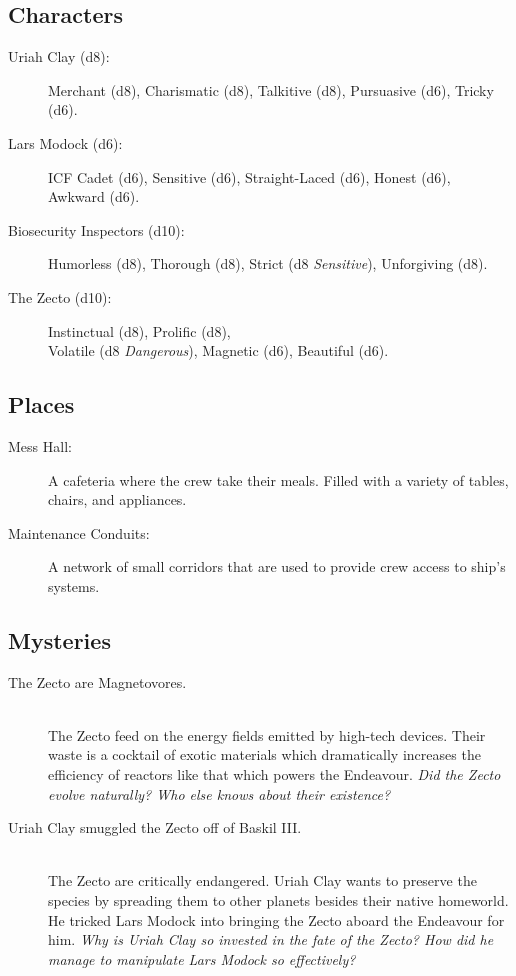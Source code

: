 \documentclass[11pt, a5paper, parskip=half-, DIV=12]{scrartcl}
\begin{document}
\newpage

\subsection*{Characters}
\begin{description}
	\item[Uriah Clay (d8):] Merchant (d8), Charismatic (d8), Talkitive (d8), Pursuasive (d6), Tricky (d6).
	\item[Lars Modock (d6):] ICF Cadet (d6), Sensitive (d6), Straight-Laced (d6), Honest (d6), Awkward (d6).
	\item[Biosecurity Inspectors (d10):] Humorless (d8), Thorough (d8), Strict (d8 \textit{Sensitive}), Unforgiving (d8).  
	\item[The Zecto (d10):] Instinctual (d8), Prolific (d8), \\Volatile (d8 \textit{Dangerous}), Magnetic (d6), Beautiful (d6).
\end{description}

\subsection*{Places}
\begin{description}
	\item[Mess Hall:] A cafeteria where the crew take their meals. Filled with a variety of tables, chairs, and appliances.
	\item[Maintenance Conduits:] A network of small corridors that are used to provide crew access to ship's systems.
\end{description}

\subsection*{Mysteries}
\begin{description}
	\item[The Zecto are Magnetovores.] \phantom{a} \\ The Zecto feed on the energy fields emitted by high-tech devices. Their waste is a cocktail of exotic materials which dramatically increases the efficiency of reactors like that which powers the Endeavour. \textit{Did the Zecto evolve naturally? Who else knows about their existence?}
	\item[Uriah Clay smuggled the Zecto off of Baskil III.] \phantom{} \\ The Zecto are critically endangered. Uriah Clay wants to preserve the species by spreading them to other planets besides their native homeworld. He tricked Lars Modock into bringing the Zecto aboard the Endeavour for him. \textit{Why is Uriah Clay so invested in the fate of the Zecto? How did he manage to manipulate Lars Modock so effectively?}
\end{description}
\end{document}
